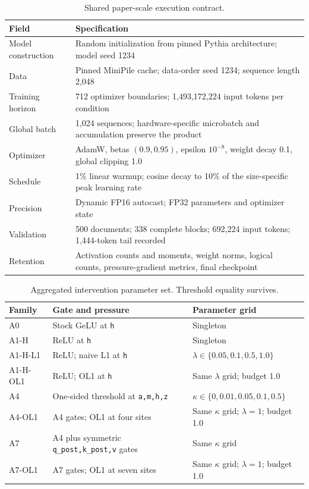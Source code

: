 \documentclass[10pt,a4paper]{article}
\newcommand{\code}[1]{\texttt{#1}}
\begin{document}
{\small
\begin{table}[htbp]
\centering
\caption{Shared paper-scale execution contract.}
\label{tab:contract}
\begin{tabularx}{\textwidth}{@{}p{37mm}Y@{}}
\toprule
\textbf{Field} & \textbf{Specification} \\
\midrule
Model construction & Random initialization from pinned Pythia architecture; model seed 1234 \\
Data & Pinned MiniPile cache; data-order seed 1234; sequence length 2,048 \\
Training horizon & 712 optimizer boundaries; 1,493,172,224 input tokens per condition \\
Global batch & 1,024 sequences; hardware-specific microbatch and accumulation preserve the product \\
Optimizer & AdamW, betas $(0.9,0.95)$, epsilon $10^{-8}$, weight decay 0.1, global clipping 1.0 \\
Schedule & 1\% linear warmup; cosine decay to 10\% of the size-specific peak learning rate \\
Precision & Dynamic FP16 autocast; FP32 parameters and optimizer state \\
Validation & 500 documents; 338 complete blocks; 692,224 input tokens; 1,444-token tail recorded \\
Retention & Activation counts and moments, weight norms, logical counts, pressure-gradient metrics, final checkpoint \\
\bottomrule
\end{tabularx}
\end{table}

\begin{table}[htbp]
\centering
\caption{Aggregated intervention parameter set. Threshold equality survives.}
\label{tab:parameters}
\begin{tabularx}{\textwidth}{@{}p{20mm}p{68mm}Y@{}}
\toprule
\textbf{Family} & \textbf{Gate and pressure} & \textbf{Parameter grid} \\
\midrule
A0 & Stock GeLU at \code{h} & Singleton \\
A1-H & ReLU at \code{h} & Singleton \\
A1-H-L1 & ReLU; naive L1 at \code{h} & $\lambda\in\{0.05,0.1,0.5,1.0\}$ \\
A1-H-OL1 & ReLU; OL1 at \code{h} & Same $\lambda$ grid; budget 1.0 \\
A4 & One-sided threshold at \code{a,m,h,z} & $\kappa\in\{0,0.01,0.05,0.1,0.5\}$ \\
A4-OL1 & A4 gates; OL1 at four sites & Same $\kappa$ grid; $\lambda=1$; budget 1.0 \\
A7 & A4 plus symmetric \code{q\_post,k\_post,v} gates & Same $\kappa$ grid \\
A7-OL1 & A7 gates; OL1 at seven sites & Same $\kappa$ grid; $\lambda=1$; budget 1.0 \\
\bottomrule
\end{tabularx}
\end{table}}
\end{document}
